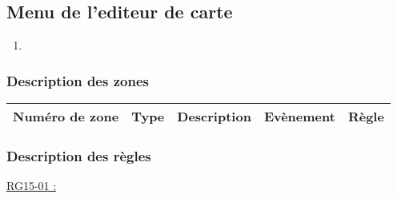 \documentclass{report}
\begin{document}
				
\newpage

	\subsection{Menu de l'editeur de carte}
		
		\hypertarget{Menu_pause_creation_carte}{}
		\label{Menu_pause_creation_carte}
			
		\begin{center}
			
		\end{center}
		
		\begin{enumerate}
		  \item 
		\end{enumerate}

		\subsubsection{Description des zones}
		
			\begin{tabular}{|c|c|c|c|c|} \hline
				Numéro de zone & Type  & Description & Evènement &	Règle \\\hline
			\end{tabular}
			
		\subsubsection{Description des règles}

			\underline{RG15-01 :}
				\begin{quote}

				\end{quote}
				
\end{document}
